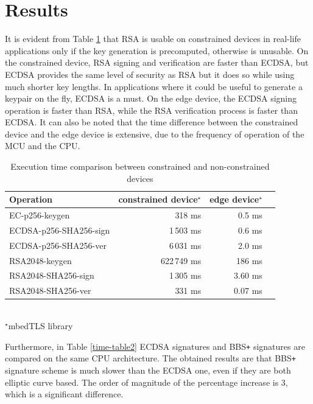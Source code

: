 \section{Results}
\label{sec-results}
It is evident from Table \ref{time-table1} that RSA is usable on constrained devices in real-life applications only if the key generation is precomputed, otherwise is unusable. On the constrained device, RSA signing and verification are faster than ECDSA, but ECDSA provides the same level of security as RSA but it does so while using much shorter key lengths. In applications where it could be useful to generate a keypair on the fly, ECDSA is a must. On the edge device, the ECDSA signing operation is faster than RSA, while the RSA verification process is faster than ECDSA.  It can also be noted that the time difference between the constrained device and the edge device is extensive, due to the frequency of operation of the MCU and the CPU.

\begin{table}[!h]
    \centering
    \begin{tabular}{| l || r | r | r |}
        \hline      
        \textbf{Operation} & \textbf{constrained device}$^\star$ & \textbf{edge device}$^\star$ \\ [0.5ex] 
        \hline \hline 
        EC-p256-keygen                  & 318 ms  & 0.5 ms \\
        \hline
        ECDSA-p256-SHA256-sign          & 1\,503 ms & 0.6 ms \\
        \hline
        ECDSA-p256-SHA256-ver           & 6\,031 ms & 2.0 ms \\
        \hline \hline
        RSA2048-keygen                  & 622\,749 ms  & 186  ms \\
        \hline
        RSA2048-SHA256-sign          & 1\,305 ms & 3.60 ms \\
        \hline
        RSA2048-SHA256-ver           & 331 ms & 0.07  ms \\
        \hline
    \end{tabular}\\
    \footnotesize $^\star$mbedTLS library
    \caption{Execution time comparison between constrained and non-constrained devices}
    \label{time-table1}
\end{table}

Furthermore, in Table \ref{time-table2} ECDSA signatures and BBS\texttt{+} signatures are compared on the same CPU architecture. The obtained results are that BBS\texttt{+} signature scheme is much slower than the ECDSA one, even if they are both elliptic curve based. The order of magnitude of the percentage increase is 3, which is a significant difference. 
   
